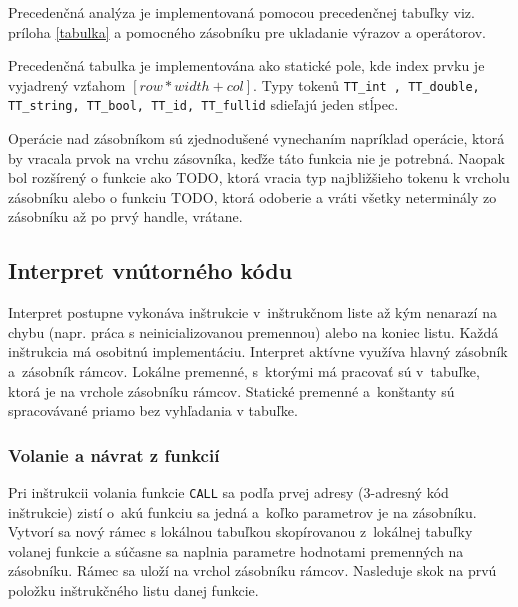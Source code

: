 \documentclass[11pt,a4paper]{article}
\begin{document}
	Precedenčná analýza je implementovaná pomocou precedenčnej tabuľky viz.
	príloha \ref{tabulka} a pomocného zásobníku pre ukladanie výrazov a operátorov.
	
	Precedenčná tabulka je implementována ako statické pole, kde index prvku je vyjadrený vzťahom $[row * width + col]$.
	Typy tokenů \texttt{TT\_int , TT\_double, TT\_string, TT\_bool, TT\_id, TT\_fullid} sdieľajú jeden stĺpec.
	
	Operácie nad zásobníkom sú zjednodušené vynechaním napríklad operácie, ktorá by vracala prvok na vrchu zásovníka, keďže táto funkcia nie je potrebná. Naopak bol rozšírený o funkcie ako TODO, ktorá vracia typ najbližšieho tokenu k vrcholu zásobníku alebo o funkciu TODO, ktorá odoberie a vráti všetky neterminály zo zásobníku až po prvý handle, vrátane.
	
	
	\subsection{Interpret vnútorného kódu}
	\label{interpret}
	Interpret postupne vykonáva inštrukcie v~inštrukčnom liste až kým nenarazí
	na chybu (napr. práca s neinicializovanou premennou) alebo na koniec listu.
	Každá inštrukcia má osobitnú implementáciu. Interpret aktívne využíva hlavný
	zásobník a~zásobník rámcov. Lokálne premenné, s~ktorými má pracovať  sú v~tabuľke,
	ktorá je na vrchole zásobníku rámcov. Statické premenné a~konštanty sú spracovávané
	priamo bez vyhľadania v tabuľke.
	
	\subsubsection{Volanie a návrat z funkcií}
	\label{funkcia}
	Pri inštrukcii volania funkcie \texttt{CALL} sa podľa prvej adresy
	(3-adresný kód inštrukcie) zistí o~akú funkciu sa jedná a~koľko parametrov
	je na zásobníku. Vytvorí sa nový rámec s lokálnou tabuľkou skopírovanou
	z~lokálnej tabuľky volanej funkcie a súčasne sa naplnia parametre
	hodnotami premenných na zásobníku. Rámec sa uloží na vrchol zásobníku rámcov.
	Nasleduje skok na prvú položku inštrukčného listu danej funkcie.
	
\end{document}
